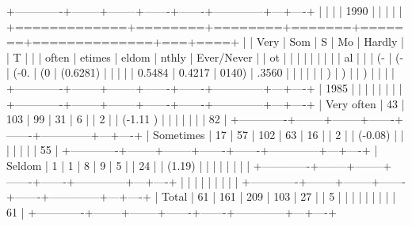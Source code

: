 +-------------+--------+--------+-------+-------+--------------+---+----+ |             |        |        | 1990  |       |              |   |    | +=============+========+========+=======+=======+==============+===+====+ |             | Very   | Som    | S     | Mo    | Hardly       |   | T  | |             | often  | etimes | eldom | nthly | Ever/Never   |   | ot | |             |        |        |       |       |              |   | al | |             | (-     | (-     | (-0.  | (0    | (0.6281)     |   |    | |             | 0.5484 | 0.4217 | 0140) | .3560 |              |   |    | |             | )      | )      |       | )     |              |   |    | +-------------+--------+--------+-------+-------+--------------+---+----+ | 1985        |        |        |       |       |              |   |    | +-------------+--------+--------+-------+-------+--------------+---+----+ | Very often  | 43     | 103    | 99    | 31    | 6            |   | 2  | | (-1.11 )    |        |        |       |       |              |   | 82 | +-------------+--------+--------+-------+-------+--------------+---+----+ | Sometimes   | 17     | 57     | 102   | 63    | 16           |   | 2  | | (-0.08)     |        |        |       |       |              |   | 55 | +-------------+--------+--------+-------+-------+--------------+---+----+ | Seldom      | 1      | 1      | 8     | 9     | 5            |   | 24 | | (1.19)      |        |        |       |       |              |   |    | +-------------+--------+--------+-------+-------+--------------+---+----+ |             |        |        |       |       |              |   |    | +-------------+--------+--------+-------+-------+--------------+---+----+ | Total       | 61     | 161    | 209   | 103   | 27           |   | 5  | |             |        |        |       |       |              |   | 61 | +-------------+--------+--------+-------+-------+--------------+---+----+

